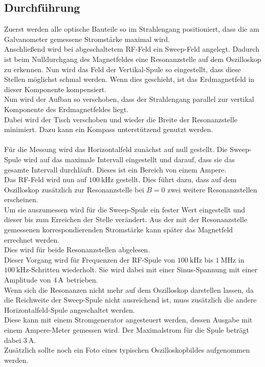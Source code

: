 \subsection{Durchführung}

Zuerst werden alle optische Bauteile so im Strahlengang positioniert, dass die am Galvanometer gemessene Stromstärke maximal wird.\\
Anschließend wird bei abgeschaltetem RF-Feld ein Sweep-Feld angelegt. Dadurch ist beim Nulldurchgang des Magnetfeldes eine Resonanzstelle auf dem Oszilloskop zu erkennen.
Nun wird das Feld der Vertikal-Spule so eingestellt, dass diese Stellen möglichst schmal werden. Wenn dies geschieht, ist das Erdmagnetfeld in dieser Komponente kompensiert.\\
Nun wird der Aufbau so verschoben, dass der Strahlengang parallel zur vertikal Komponente des Erdmagnetfeldes liegt. \\
Dabei wird der Tisch verschoben und wieder die Breite der Resonanzstelle minimiert. Dazu kann ein Kompass unterstützend genutzt werden.\\\\
Für die Messung wird das Horizontalfeld zunächst auf null gestellt.
Die Sweep-Spule wird auf das maximale Intervall eingestellt und darauf, dass sie das gesamte Intervall durchläuft. Dieses ist ein Bereich von einem Ampere.\\
Das RF-Feld wird nun auf $\SI{100}{\kilo\hertz}$ gestellt.
Dies führt dazu, dass auf dem Oszilloskop zusätzlich zur Resonanzstelle bei $B=0$ zwei weitere Resonanzstellen erscheinen.\\
Um sie auszumessen wird für die Sweep-Spule ein fester Wert eingestellt und dieser bis zum Erreichen der Stelle verändert.
Aus der mit der Resonanzstelle gemessenen korrespondierenden Stromstärke kann später das Magnetfeld errechnet werden.\\
Dies wird für beide Resonanzstellen abgelesen.\\
Dieser Vorgang wird für Frequenzen der RF-Spule von $\SI{100}{\kilo\hertz}$  bis $\SI{1}{\mega\hertz}$ in $ \SI{100}{\kilo\hertz}$-Schritten wiederholt.
Sie wird dabei mit einer Sinus-Spannung mit einer Amplitude von $\SI{4}{{\ampere}}$ betrieben.\\
Wenn sich die Resonanzen nicht mehr auf dem Oszilloskop darstellen lassen, da die Reichweite der Sweep-Spule nicht ausreichend ist, muss zusätzlich die andere Horizontalfeld-Spule angeschaltet werden.\\
Diese kann mit einem Stromgenerator angesteuert werden, dessen Ausgabe mit einem Ampere-Meter gemessen wird. Der Maximalstrom für die Spule beträgt dabei $\SI{3}{\ampere}$.\\
Zusätzlich sollte noch ein Foto eines typischen Oszilloskopbildes aufgenommen werden.
